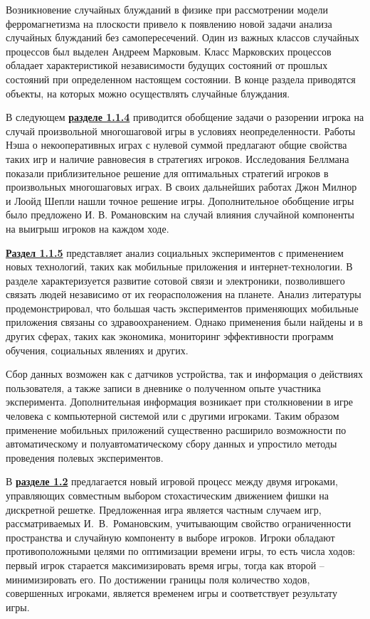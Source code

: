 Возникновение случайных блужданий в физике при рассмотрении модели ферромагнетизма на плоскости привело к появлению 
новой задачи анализа случайных блужданий без самопересечений. Один из важных классов случайных процессов
был выделен Андреем Марковым. Класс Марковских процессов обладает характеристикой независимости
будущих состояний от прошлых состояний при определенном настоящем состоянии. В конце раздела приводятся 
объекты, на которых можно осуществлять случайные блуждания.

В следующем \underline{\textbf{разделе 1.1.4}} приводится обобщение задачи о разорении игрока 
на случай произвольной многошаговой игры в условиях неопределенности. Работы Нэша о
некооперативных играх с нулевой суммой предлагают общие свойства таких игр и наличие 
равновесия в стратегиях игроков. Исследования Беллмана показали приблизительное решение 
для оптимальных стратегий игроков в произвольных многошаговых играх. В своих дальнейших работах 
Джон Милнор и Лоойд Шепли нашли точное решение игры. Дополнительное обобщение игры
было предложено И. В. Романовским на случай влияния случайной компоненты на выигрыш игроков 
на каждом ходе. 

\underline{\textbf{Раздел 1.1.5}} представляет анализ социальных экспериментов 
с применением новых технологий, таких как мобильные приложения и интернет-технологии.
В разделе характеризуется развитие сотовой связи и электроники, позволившего связать
людей независимо от их георасположения на планете. Анализ литературы продемонстрировал,
что большая часть экспериментов применяющих мобильные приложения связаны со здравоохранением.
Однако применения были найдены и в других сферах, таких как экономика, мониторинг эффективности программ обучения,
социальных явлениях и других. 

Сбор данных возможен как с датчиков устройства, так и информация о действиях пользователя,
а также записи в дневнике о полученном опыте участника эксперимента. Дополнительная информация
возникает при столкновении в игре человека с компьютерной системой или с другими игроками.
Таким образом применение мобильных приложений существенно расширило возможности  
по автоматическому и полуавтоматическому сбору данных и упростило методы проведения полевых экспериментов.

В \underline{\textbf{разделе 1.2}} предлагается новый игровой процесс между двумя игроками, управляющих
совместным выбором стохастическим движением фишки на дискретной решетке. Предложенная игра
является частным случаем игр, рассматриваемых И.~В.~Романовским, учитывающим свойство ограниченности пространства
и случайную компоненту в выборе игроков. Игроки обладают противоположными целями по оптимизации 
времени игры, то есть числа ходов: первый игрок старается максимизировать время игры, тогда как второй -- минимизировать его.
По достижении границы поля количество ходов, совершенных игроками, является временем игры и соответствует результату игры.


